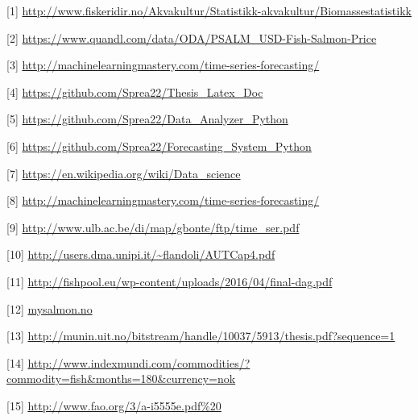 
[1] \url{http://www.fiskeridir.no/Akvakultur/Statistikk-akvakultur/Biomassestatistikk}


[2] \url{https://www.quandl.com/data/ODA/PSALM_USD-Fish-Salmon-Price}


[3] \url{http://machinelearningmastery.com/time-series-forecasting/}


[4] \url{https://github.com/Sprea22/Thesis_Latex_Doc}


[5] \url{https://github.com/Sprea22/Data_Analyzer_Python}


[6] \url{https://github.com/Sprea22/Forecasting_System_Python}

[7] \url{https://en.wikipedia.org/wiki/Data_science}

[8] \url{http://machinelearningmastery.com/time-series-forecasting/}

[9] \url{http://www.ulb.ac.be/di/map/gbonte/ftp/time_ser.pdf}

[10] \url{http://users.dma.unipi.it/~flandoli/AUTCap4.pdf}

[11] \url{http://fishpool.eu/wp-content/uploads/2016/04/final-dag.pdf}

[12] \url{mysalmon.no}

[13] \url{http://munin.uit.no/bitstream/handle/10037/5913/thesis.pdf?sequence=1}

[14] \url{http://www.indexmundi.com/commodities/?commodity=fish&months=180&currency=nok}

[15] \url{http://www.fao.org/3/a-i5555e.pdf%20}